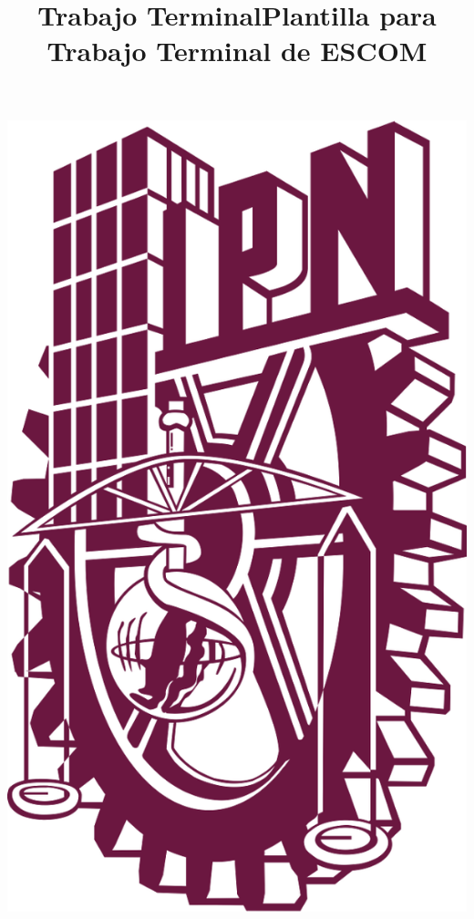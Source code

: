 \documentclass[11pt]{report}
\title{Trabajo Terminal}
\title{Plantilla para Trabajo Terminal de ESCOM}
\begin{document}
\begin{center}
\newcommand{\HRule}{\rule{\linewidth}{0.5mm}}
\begin{minipage}{0.48\textwidth} \begin{flushleft}
\includegraphics[scale = 0.09]{./images/ipn.png}
\end{flushleft}\end{minipage}
\begin{minipage}{0.48\textwidth} \begin{flushright}

\end{flushright}
\end{minipage}
\end{center}
\end{document}
